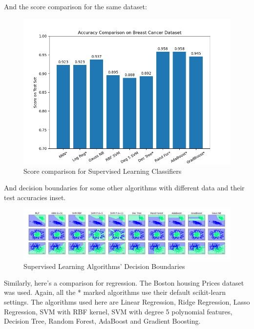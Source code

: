 \documentclass{article}
\begin{document}
And the score comparison for the same dataset:

\begin{figure}[H]
\includegraphics[width=0.5\linewidth]{Images/sup_learn_comp_sco.png}
\centering
\caption{Score comparison for Supervised Learning Classifiers}
\end{figure}

And decision boundaries for some other algorithms with different data and their test accuracies inset.

\begin{figure}[H]
\includegraphics[width=\linewidth]{Images/sup_learn_decisions.png}
\centering
\caption{Supervised Learning Algorithms' Decision Boundaries}
\end{figure}

Similarly, here's a comparison for regression. The Boston housing Prices dataset was used. Again, all the * marked algorithms use their default scikit-learn settings. The algorithms used here are Linear Regression, Ridge Regression, Lasso Regression, SVM with RBF kernel, SVM with degree 5 polynomial features, Decision Tree, Random Forest, AdaBoost and Gradient Boosting.
\end{document}
